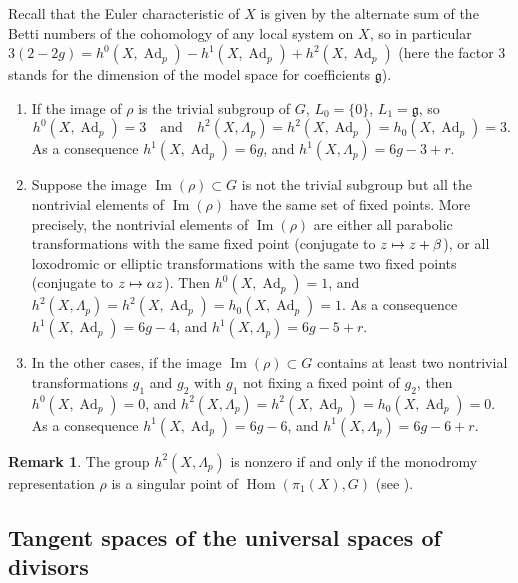 \documentclass[JEP,XML,SOM,Unicode,NoEqCountersInSection,published]{cedram}
\newcommand\mto{\mathchoice{\longmapsto}{\mapsto}{\mapsto}{\mapsto}}
\DeclareMathOperator{\Ad}{Ad}
\DeclareMathOperator{\Hom}{Hom}
\DeclareMathOperator{\Image}{Im}
\theoremstyle{definition}
\newtheorem{remark}[definition]{Remark}
\theoremstyle{plain}
\begin{document}
Recall that the Euler characteristic of $X$ is given by the alternate sum of the Betti numbers of the cohomology of any local system on $X$, so in particular $3(2-2g) = h^0\left(X, \Ad_p\right) - h^1\left(X, \Ad_p\right) + h^2\left(X, \Ad_p\right)$ (here the factor $3$ stands for the dimension of the model space for coefficients $\mathfrak g$).
\begin{enumerate}
\item
If the image of $\rho$ is the trivial subgroup of $G$, $L_0 = \{0\}$, $L_1 = \mathfrak g$, so
\[
h^0\left(X, \Ad_p\right) = 3\quad\text{and}\quad h^2\left(X, \Lambda_p\right) = h^2\left(X, \Ad_p\right) = h_0\left(X, \Ad_p\right) = 3.
\]
As a consequence $h^1\left(X, \Ad_p\right) = 6g$, and $h^1\left(X, \Lambda_p\right) = 6g-3+r$.
\item
Suppose the image $\Image(\rho) \subset G$ is not the trivial subgroup but all the nontrivial elements of $\Image(\rho)$ have the same set of fixed points.
More precisely, the nontrivial elements of $\Image(\rho)$ are either all parabolic transformations with the same fixed point (conjugate to $z \mto z + \beta$), or all loxodromic or elliptic transformations with the same two fixed points (conjugate to $z \mto \alpha z$).
Then $h^0\left(X, \Ad_p\right) = 1$, and $h^2\left(X, \Lambda_p\right) = h^2\left(X, \Ad_p\right) = h_0\left(X, \Ad_p\right) = 1$.
As a consequence $h^1\left(X, \Ad_p\right) = 6g-4$, and $h^1\left(X, \Lambda_p\right) = 6g-5+r$.
\item
In the other cases, \ie if the image $\Image(\rho) \subset G$ contains at least two nontrivial transformations $g_1$ and $g_2$ with $g_1$ not fixing a fixed point of $g_2$, then $h^0\left(X, \Ad_p\right) = 0$, and $h^2\left(X, \Lambda_p\right) = h^2\left(X, \Ad_p\right) = h_0\left(X, \Ad_p\right) = 0$.
As a consequence $h^1\left(X, \Ad_p\right) = 6g-6$, and $h^1\left(X, \Lambda_p\right) = 6g-6+r$.
\end{enumerate}

\begin{remark}
The group $h^2\left(X, \Lambda_p\right)$ is nonzero if and only if the monodromy representation $\rho$ is a singular point of $\Hom(\pi_1(X), G)$ (see \cite{hubbard}).
\end{remark}

\subsection{Tangent spaces of the universal spaces of divisors}\label{subsection_tangent_spaces_univ_spaces_div}
\end{document}
